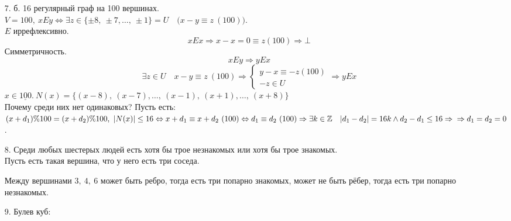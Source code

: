 \documentclass[12pt, letterpaper, twoside]{article}
\begin{document}
        \begin{enumerate}
            \item[7. б.] 16 регулярный граф на 100 вершинах.\\
            $V = 100,\ xEy \Leftrightarrow \exists z\in \{\pm 8,\ \pm 7,\dots,\ \pm 1\} = U\quad \big(x - y\equiv z\ (100)\big)$.\\
            $E$ иррефлексивно.
            \[xEx \Rightarrow x - x = 0 \equiv z (100)\Rightarrow \bot\]
            Симметричность.
            \[xEy \Rightarrow yEx\]
            \[\exists z \in U\quad x - y \equiv z\ (100)\Rightarrow \begin{cases}
                y - x \equiv -z (100)\\
                -z \in U
            \end{cases}\Rightarrow yEx\]
            $x\in \underline{100}.\ N(x) = \{(x - 8),\ (x - 7),\dots,\ (x - 1),\ (x + 1),\dots,\ (x + 8)\}$\\
            Почему среди них нет одинаковых? Пусть есть:\\
            $(x + d_1)\% 100 = (x + d_2)\% 100,\ |N(x)|\leq 16\\
            \Leftrightarrow x + d_1 \equiv x + d_2\ (100)\\
            \Leftrightarrow d_1 \equiv d_2\ (100) \Rightarrow \exists k\in \mathbb{Z}\quad |d_1 - d_2| = 16k\wedge d_2 - d_1 \leq 16\Rightarrow\\
            \Rightarrow d_1 = d_2 = 0$.
            \item[8.] Среди любых шестерых людей есть хотя бы трое незнакомых или хотя бы трое знакомых.\\
            Пусть есть такая вершина, что у него есть три соседа.
            Между вершинами $3,\ 4,\ 6$ может быть ребро, тогда есть три попарно знакомых, может не быть рёбер, тогда есть три попарно незнакомых.
            \item[9.] Булев куб:\\

\end{enumerate}
\end{document}
